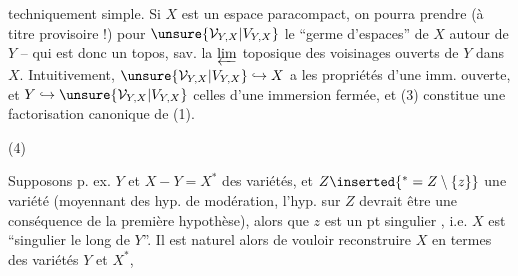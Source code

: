 
techniquement simple. Si $X$ est un  espace paracompact, on pourra prendre (à titre provisoire !) pour $\unsure{\mathcal V_{Y,X}|V_{Y,X}}$ le ``germe d'espaces'' de $X$ autour de $Y$ -- qui est donc un topos, sav. la $\varprojlim$ toposique des voisinages ouverts de $Y$ dans $X$. Intuitivement, $\unsure{\mathcal V_{Y,X}|V_{Y,X}}\hookrightarrow X$ a les propriétés d'une imm. ouverte, et $Y\hookrightarrow\unsure{\mathcal V_{Y,X}|V_{Y,X}}$ celles d'une immersion fermée, et (3) constitue une factorisation canonique de (1).



(4)

Supposons p. ex. $Y$ et $X-Y=X^*$ des variétés, et $Z\inserted{{}^*=Z\setminus\{z\}}$ une variété (moyennant des hyp. de modération, l'hyp. sur $Z$ devrait être une conséquence de la première hypothèse),  alors que $z$ est un pt singulier , i.e. $X$ est ``singulier le long de $Y$''. Il est naturel alors de vouloir reconstruire $X$ en termes des variétés $Y$ et $X^*$,

